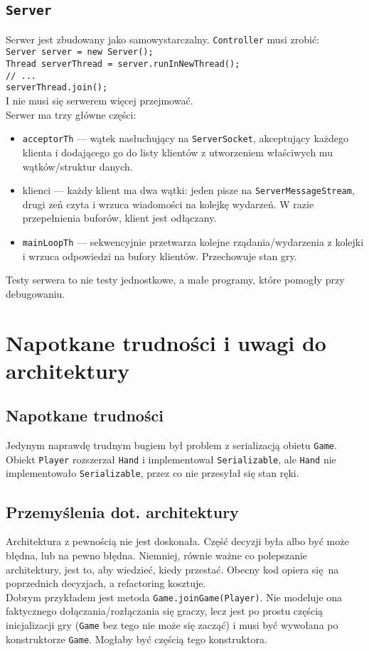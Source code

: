 \documentclass{article}
\newcommand{\ch}[1]{\texttt{#1}}
\begin{document}
\subsection{\ch{Server}}

Serwer jest zbudowany jako samowystarczalny. \ch{Controller} musi zrobić:\\
\ch{Server server = new Server();\\
Thread serverThread = server.runInNewThread();\\
// ...\\
serverThread.join();}\\
I nie musi się serwerem więcej przejmować.\\

Serwer ma trzy główne części:
\begin{itemize}
	\item \ch{acceptorTh} --- wątek nasłuchujący na \ch{ServerSocket}, akceptujący każdego klienta i dodającego go do listy klientów z utworzeniem właściwych mu wątków/struktur danych.
	\item klienci --- każdy klient ma dwa wątki: jeden pisze na \ch{ServerMessageStream}, drugi zeń czyta i wrzuca wiadomości na kolejkę wydarzeń. W razie przepełnienia buforów, klient jest odłączany.
	\item \ch{mainLoopTh} --- sekwencyjnie przetwarza kolejne rządania/wydarzenia z kolejki i wrzuca odpowiedzi na bufory klientów. Przechowuje stan gry.
\end{itemize}

Testy serwera to nie testy jednostkowe, a małe programy, które pomogły przy debugowaniu.

\section{Napotkane trudności i uwagi do architektury}

\subsection{Napotkane trudności}

Jedynym naprawdę trudnym bugiem był problem z serializacją obietu \ch{Game}. Obiekt \ch{Player} rozszerzał \ch{Hand} i implementował \ch{Serializable}, ale \ch{Hand} nie implementowało \ch{Serializable}, przez co nie przesyłał się stan ręki.

\subsection{Przemyślenia dot. architektury}

Architektura z pewnością nie jest doskonała. Część decyzji była albo być może błędna, lub na pewno błędna. Niemniej, równie ważne co polepszanie architektury, jest to, aby wiedzieć, kiedy przestać. Obecny kod opiera się na poprzednich decyzjach, a refactoring kosztuje.\\

Dobrym przykładem jest metoda \ch{Game.joinGame(Player)}. Nie modeluje ona faktycznego dołączania/rozłączania się graczy, lecz jest po prostu częścią inicjalizacji gry (\ch{Game} bez tego nie może się zacząć) i musi być wywołana po konstruktorze \ch{Game}. Mogłaby być częścią tego konstruktora.
\end{document}
